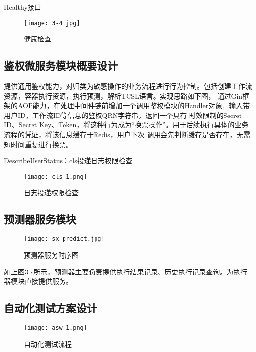 Healthy接口
\begin{figure}[H]
    \centering
    \texttt{[image: 3-4.jpg]}
    \caption{健康检查}
    \label{fig:健康检查}
\end{figure}

\subsection{鉴权微服务模块概要设计}

提供通用鉴权能力，对归类为敏感操作的业务流程进行行为控制。包括创建工作流资源，容器执行资源，执行预测，解析TCSL语言。实现思路如下图，
通过Gin框架的AOP能力，在处理中间件链前增加一个调用鉴权模块的Handler对象，输入带用户ID，工作流ID等信息的鉴权QRN字符串，返回一个具有
时效限制的Secret ID、Secret Key、Token，将这种行为成为“换票操作”。用于后续执行具体的业务流程的凭证，将该信息缓存于Redis，用户下次
调用会先判断缓存是否存在，无需短时间重复进行换票。

DescribeUserStatus：cls投递日志权限检查

\begin{figure}[H]
    \centering
    \texttt{[image: cls-1.png]}
    \caption{日志投递权限检查}
    \label{fig:rztdqx}
\end{figure}


\subsection{预测器服务模块}

\begin{figure}[H]
    \centering
    \texttt{[image: sx\_predict.jpg]}
    \caption{预测器服务时序图}
    \label{fig:预测器服务时序图}
\end{figure}

如上图3.x所示，预测器主要负责提供执行结果记录、历史执行记录查询。为执行器模块直接提供服务。



\subsection{自动化测试方案设计}

\begin{figure}[H]
    \centering
    \texttt{[image: asw-1.png]}
    \caption{自动化测试流程}
    \label{fig:自动化测试流程}
\end{figure}



